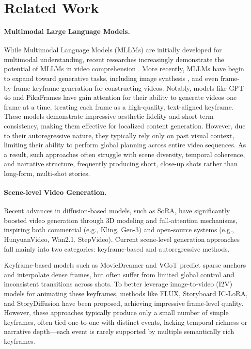 \section{Related Work}

\paragraph{Multimodal Large Language Models.}
While Multimodal Language Models (MLLMs) \cite{touvron2023llama, liu2023visual, chen2024internvl} are initially developed for multimodal understanding, recent researches increasingly demonstrate the potential of MLLMs in video comprehension \cite{zhang2023video, lin2023video}. More recently, MLLMs have begin to expand toward generative tasks, including image synthesis \cite{pan2023kosmos, sun2023emu}, and even frame-by-frame keyframe generation \cite{zhou2024storydiffusion} for constructing videos.
Notably, models like GPT-4o \cite{gpt4o} and PikaFrames \cite{pikaframes} have gain attention for their ability to generate videos one frame at a time, treating each frame as a high-quality, text-aligned keyframe. These models demonstrate impressive aesthetic fidelity and short-term consistency, making them effective for localized content generation. However, due to their autoregressive nature, they typically rely only on past visual context, limiting their ability to perform global planning across entire video sequences. As a result, such approaches often struggle with scene diversity, temporal coherence, and narrative structure, frequently producing short, close-up shots rather than long-form, multi-shot stories.

\paragraph{Scene-level Video Generation.}

Recent advances in diffusion-based models\cite{zhang2025generativepretrainedautoregressivediffusion}, such as SoRA\cite{openaisora}, have significantly boosted video generation through 3D modeling and full-attention mechanisms, inspiring both commercial (e.g., Kling\cite{kling}, Gen-3\cite{runwaygen3}) and open-source systems (e.g., HunyuanVideo\cite{kong2024hunyuanvideo}, Wan2.1\cite{wan2025wanopenadvancedlargescale}, StepVideo\cite{ma2025stepvideot2vtechnicalreportpractice,huang2025step}). Current scene-level generation approaches fall mainly into two categories: keyframe-based and autoregressive methods.

Keyframe-based models such as MovieDreamer\cite{zhao2024moviedreamer} and VGoT\cite{zheng2024videogen} predict sparse anchors and interpolate dense frames, but often suffer from limited global control and inconsistent transitions across shots. To better leverage image-to-video (I2V) models for animating these keyframes, methods like FLUX\cite{flux}, Storyboard IC-LoRA\cite{huang2024context}, and StoryDiffusion\cite{zhou2024storydiffusion} have been proposed, achieving impressive frame-level quality. However, these approaches typically produce only a small number of simple keyframes, often tied one-to-one with distinct events, lacking temporal richness or narrative depth—each event is rarely supported by multiple semantically rich keyframes.

